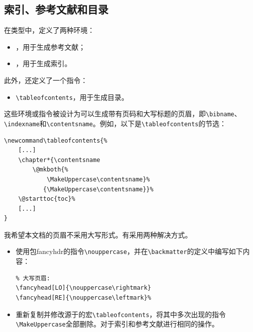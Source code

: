 \subsection{索引、参考文献和目录}

在类型中，定义了两种环境：

\begin{itemize}
    \item {}，用于生成参考文献；
    \item {}，用于生成索引。
\end{itemize}

此外，还定义了一个指令：

\begin{itemize}
    \item \verb|\tableofcontents|，用于生成目录。
\end{itemize}

这些环境或指令被设计为可以生成带有页码和大写标题的页眉，即\verb|\bibname|、\verb|\indexname|和\verb|\contentsname|。例如，以下是\verb|\tableofcontents|的节选：

\begin{dmd}
\begin{verbatim}
\newcommand\tableofcontents{% 
    [...]
    \chapter*{\contentsname 
        \@mkboth{%
            \MakeUppercase\contentsname}% 
           {\MakeUppercase\contentsname}}%
    \@starttoc{toc}% 
    [...]
}
\end{verbatim}
\end{dmd}

我希望本文档的页眉不采用大写形式。有采用两种解决方式。

\begin{itemize}
    \item 使用包\textsf{fancyhdr}的指令\verb|\nouppercase|，并在\verb|\backmatter|的定义中编写如下内容：
    \begin{dmd}
    \begin{verbatim}
% 大写页眉: 
\fancyhead[LO]{\nouppercase\rightmark} 
\fancyhead[RE]{\nouppercase\leftmark}%
    \end{verbatim}
    \end{dmd}
    
    \item  重新复制并修改源于的宏\verb|\tableofcontents|，将其中多次出现的指令\verb|\MakeUppercase|全部删除。对于索引和参考文献进行相同的操作。
\end{itemize}

